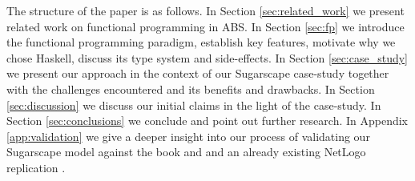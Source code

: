 The structure of the paper is as follows. 
In Section \ref{sec:related_work} we present related work on functional programming in ABS. 
In Section \ref{sec:fp} we introduce the functional programming paradigm, establish key features, motivate why we chose Haskell, discuss its type system and side-effects. 
In Section \ref{sec:case_study} we present our approach in the context of our Sugarscape case-study together with the challenges encountered and its benefits and drawbacks.
In Section \ref{sec:discussion} we discuss our initial claims in the light of the case-study.
In Section \ref{sec:conclusions} we conclude and point out further research.
In Appendix \ref{app:validation} we give a deeper insight into our process of validating our Sugarscape model against the book and \cite{epstein_growing_1996} and an already existing NetLogo replication \cite{weaver_replicating_nodate}.